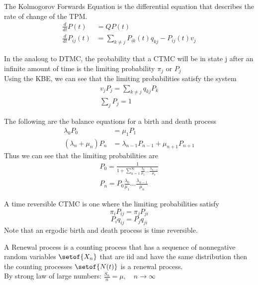 \documentclass[answers,12pt,addpoints]{exam}
\begin{document}
\begin{definition}
    The Kolmogorov Forwards Equation is the differential equation that describes the rate of change of the TPM.\\
    \begin{align*}
        \frac{d}{dt} P(t) &= QP(t)\\
        \frac{d}{dt} P_{ij}(t) &= \sum_{k \neq j} P_{ik}(t)q_{kj} - P_{ij}(t)v_j
    \end{align*}
\end{definition}
\begin{definition}
    In the analoug to DTMC, the probability that a CTMC will be in state j after an infinite amount of time is the limiting probability $\pi_j$ or $P_j$\\
    Using the KBE, we can see that the limiting probabilities satisfy the system
    \begin{align*}
        v_j P_j = \sum_{k \neq j} q_{kj}P_k\\
        \sum_{j} P_j = 1
    \end{align*}
\end{definition}
\begin{definition}[BD Balance Eq]
    The following are the balance equations for a birth and death process
    \begin{align*}
        \lambda_0 P_0 &= \mu_1 P_1\\
        (\lambda_n + \mu_n) P_n &= \lambda_{n-1} P_{n-1} + \mu_{n+1} P_{n+1}
    \end{align*}
    Thus we can see that the limiting probabilities are
    \begin{align*}
        P_0 =\frac{1}{1+ \sum_{n=1}^{\infty} \frac{\lambda_0}{\mu_1}\ldots\frac{\lambda_{n-1}}{\mu_n}}\\
        P_n = P_0 \frac{\lambda_0}{\mu_1}\ldots\frac{\lambda_{n-1}}{\mu_n}
    \end{align*}
\end{definition}
\begin{definition}
    A time reversible CTMC is one where the limiting probabilities satisfy 
    $$ \pi_i P_{ij} = \pi_j P_{ji}$$
    $$ P_i  q_{ij} = P_j q_{ji}$$
    Note that an ergodic birth and death process is time reversible.
\end{definition}
\begin{definition}
        A Renewal process is a counting process that has a sequence of nonnegative random variables $\setof{X_n}$ that are iid and have the same distribution then the counting processes $\setof{N(t)}$ is a renewal process.\\
        By strong law of large numbers: $\frac{S_n}{n} = \mu, \quad n \to 
        \infty$
\end{definition}
\end{document}
